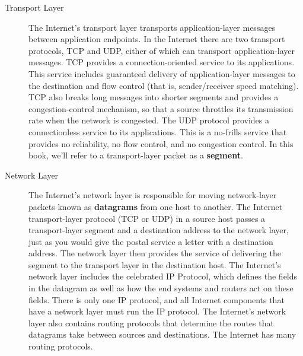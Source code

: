\documentclass{article}
\begin{document}
\begin{description}
\begin{description}
        \item[Transport Layer] The Internet’s transport layer transports application-layer messages between
        application endpoints. In the Internet there are two transport protocols, TCP and
        UDP, either of which can transport application-layer messages. TCP provides a
        connection-oriented service to its applications. This service includes guaranteed
        delivery of application-layer messages to the destination and flow control (that is,
        sender/receiver speed matching). TCP also breaks long messages into shorter segments
        and provides a congestion-control mechanism, so that a source throttles its
        transmission rate when the network is congested. The UDP protocol provides a connectionless
        service to its applications. This is a no-frills service that provides no
        reliability, no flow control, and no congestion control. In this book, we’ll refer to a
        transport-layer packet as a {\bf segment}.
        
        \item[Network Layer] The Internet’s network layer is responsible for moving network-layer packets
        known as {\bf datagrams} from one host to another. The Internet transport-layer protocol
        (TCP or UDP) in a source host passes a transport-layer segment and a destination
        address to the network layer, just as you would give the postal service a letter
        with a destination address. The network layer then provides the service of delivering
        the segment to the transport layer in the destination host.
        The Internet’s network layer includes the celebrated IP Protocol, which defines
        the fields in the datagram as well as how the end systems and routers act on these
        fields. There is only one IP protocol, and all Internet components that have a network
        layer must run the IP protocol. The Internet’s network layer also contains routing
        protocols that determine the routes that datagrams take between sources and destinations. The Internet has many routing protocols.
        

\end{description}
\end{description}
\end{document}
